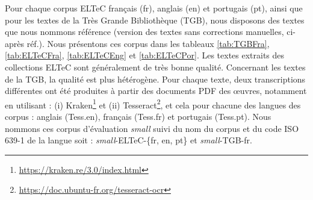 Pour chaque corpus ELTeC français (fr), anglais (en) et portugais (pt), ainsi que pour les textes de la Très Grande Bibliothèque (TGB), nous disposons des textes que nous nommons \og{}référence\fg{} (version des textes sans corrections manuelles, ci-après \og{}réf.\fg{}). Nous présentons ces corpus dans les tableaux \ref{tab:TGBFra}, \ref{tab:ELTeCFra}, \ref{tab:ELTeCEng} et \ref{tab:ELTeCPor}. Les textes extraits des collections ELTeC sont généralement de très bonne qualité. Concernant les textes de la TGB, la qualité est plus hétérogène. Pour chaque texte, deux transcriptions différentes ont été produites à partir des documents PDF des œuvres, notamment en utilisant : (i) Kraken\footnote{\url{https://kraken.re/3.0/index.html}} \cite{kiessling2019escriptorium} et (ii) Tesseract\footnote{\url{https://doc.ubuntu-fr.org/tesseract-ocr}}, et cela pour chacune des langues des corpus : anglais (Tess.en), français (Tess.fr) et portugais (Tess.pt). Nous nommons ces corpus d'évaluation \textit{small} suivi du nom du corpus et du code ISO 639-1 de la langue soit : \textit{small}-ELTeC-\{fr, en, pt\} et \textit{small}-TGB-fr. 

